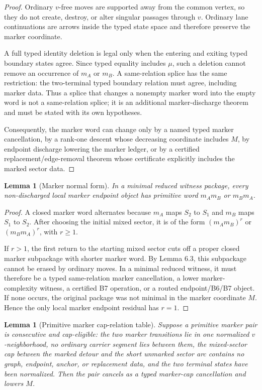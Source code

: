 \documentclass[11pt]{amsart}
\newtheorem{lemma}[theorem]{Lemma}
\theoremstyle{definition}
\begin{document}
\begin{proof}
Ordinary \(v\)-free moves are supported away from the common vertex, so they do not create, destroy, or alter singular passages through \(v\). Ordinary lane continuations are arrows inside the typed state space and therefore preserve the marker coordinate.

A full typed identity deletion is legal only when the entering and exiting typed boundary states agree. Since typed equality includes \(\mu\), such a deletion cannot remove an occurrence of \(m_A\) or \(m_B\). A same-relation splice has the same restriction: the two-terminal typed boundary relation must agree, including marker data. Thus a splice that changes a nonempty marker word into the empty word is not a same-relation splice; it is an additional marker-discharge theorem and must be stated with its own hypotheses.

Consequently, the marker word can change only by a named typed marker cancellation, by a rank-one descent whose decreasing coordinate includes \(M\), by endpoint discharge lowering the marker ledger, or by a certified replacement/edge-removal theorem whose certificate explicitly includes the marked sector data.

\end{proof}
\begin{lemma}[Marker normal form]
In a minimal reduced witness package, every non-discharged local marker endpoint object has primitive word \(m_A m_B\) or \(m_B m_A\).

\end{lemma}
\begin{proof}
A closed marker word alternates because \(m_A\) maps \(S_2\) to \(S_1\) and \(m_B\) maps \(S_1\) to \(S_2\). After choosing the initial mixed sector, it is of the form \((m_A m_B)^r\) or \((m_B m_A)^r\), with \(r\ge1\).

If \(r>1\), the first return to the starting mixed sector cuts off a proper closed marker subpackage with shorter marker word. By Lemma 6.3, this subpackage cannot be erased by ordinary moves. In a minimal reduced witness, it must therefore be a typed same-relation marker cancellation, a lower marker-complexity witness, a certified B7 operation, or a routed endpoint/B6/B7 object. If none occurs, the original package was not minimal in the marker coordinate \(M\). Hence the only local marker endpoint residual has \(r=1\).

\end{proof}
\begin{lemma}[Primitive marker cap-relation table]
Suppose a primitive marker pair is consecutive and cap-eligible: the two marker transitions lie in one normalized \(v\)-neighborhood, no ordinary carrier segment lies between them, the mixed-sector cap between the marked detour and the short unmarked sector arc contains no graph, endpoint, anchor, or replacement data, and the two terminal states have been normalized. Then the pair cancels as a typed marker-cap cancellation and lowers \(M\).

\end{lemma}
\end{document}
